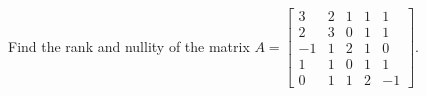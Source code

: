 Find the rank and nullity of the matrix 
$A = \begin{bmatrix} 
3 & 2 & 1 & 1 & 1\\ 
2 & 3 & 0 & 1 & 1\\ 
-1 & 1 & 2 & 1 & 0\\
1 & 1 & 0 & 1 & 1\\ 
0 & 1 & 1 & 2 & -1
\end{bmatrix}$.